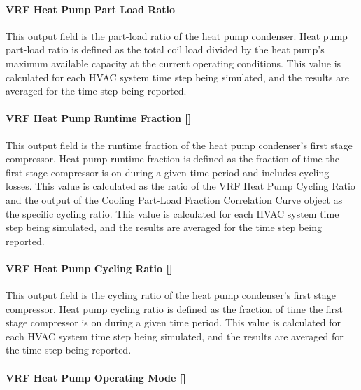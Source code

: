 \paragraph{VRF Heat Pump Part Load Ratio}\label{vrf-heat-pump-part-load-ratio}

This output field is the part-load ratio of the heat pump condenser. Heat pump part-load ratio is defined as the total coil load divided by the heat pump's maximum available capacity at the current operating conditions. This value is calculated for each HVAC system time step being simulated, and the results are averaged for the time step being reported.

\paragraph{\texorpdfstring{VRF Heat Pump Runtime Fraction {[]}}{VRF Heat Pump Runtime Fraction }}\label{vrf-heat-pump-runtime-fraction}

This output field is the runtime fraction of the heat pump condenser's first stage compressor. Heat pump runtime fraction is defined as the fraction of time the first stage compressor is on during a given time period and includes cycling losses. This value is calculated as the ratio of the VRF Heat Pump Cycling Ratio and the output of the Cooling Part-Load Fraction Correlation Curve object as the specific cycling ratio. This value is calculated for each HVAC system time step being simulated, and the results are averaged for the time step being reported.

\paragraph{\texorpdfstring{VRF Heat Pump Cycling Ratio {[]}}{VRF Heat Pump Cycling Ratio }}\label{vrf-heat-pump-cycling-ratio}

This output field is the cycling ratio of the heat pump condenser's first stage compressor. Heat pump cycling ratio is defined as the fraction of time the first stage compressor is on during a given time period. This value is calculated for each HVAC system time step being simulated, and the results are averaged for the time step being reported.

\paragraph{\texorpdfstring{VRF Heat Pump Operating Mode {[]}}{VRF Heat Pump Operating Mode }}\label{vrf-heat-pump-operating-mode}

